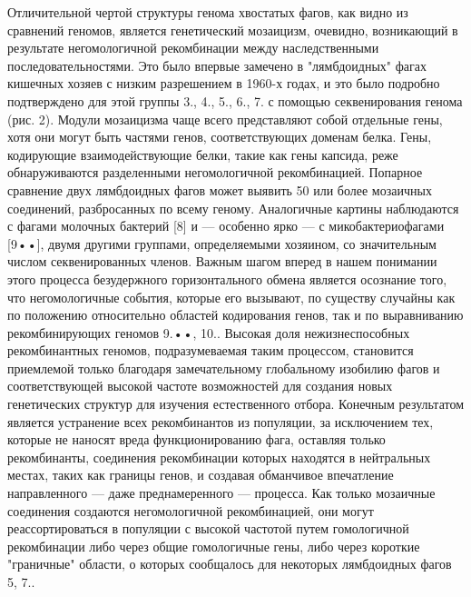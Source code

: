 \documentclass[a4paper,12pt]{article}
\begin{document}
    \par{Отличительной чертой структуры генома хвостатых фагов, как видно из сравнений геномов, является генетический
    мозаицизм, очевидно, возникающий в результате негомологичной рекомбинации между наследственными
    последовательностями. Это было впервые замечено в "лямбдоидных" фагах кишечных хозяев с низким разрешением в 1960-х
    годах, и это было подробно подтверждено для этой группы 3., 4., 5., 6., 7. с помощью секвенирования генома (рис. 2).
    Модули мозаицизма чаще всего представляют собой отдельные гены, хотя они могут быть частями генов, соответствующих
    доменам белка. Гены, кодирующие взаимодействующие белки, такие как гены капсида, реже обнаруживаются разделенными
    негомологичной рекомбинацией. Попарное сравнение двух лямбдоидных фагов может выявить 50 или более мозаичных
    соединений, разбросанных по всему геному. Аналогичные картины наблюдаются с фагами молочных бактерий [8] и —
    особенно ярко — с микобактериофагами [9••], двумя другими группами, определяемыми хозяином, со значительным числом
    секвенированных членов. Важным шагом вперед в нашем понимании этого процесса безудержного горизонтального обмена
    является осознание того, что негомологичные события, которые его вызывают, по существу случайны как по положению
    относительно областей кодирования генов, так и по выравниванию рекомбинирующих геномов 9.••, 10.. Высокая доля
    нежизнеспособных рекомбинантных геномов, подразумеваемая таким процессом, становится приемлемой только благодаря
    замечательному глобальному изобилию фагов и соответствующей высокой частоте возможностей для создания новых 
    генетических структур для изучения естественного отбора. Конечным результатом является устранение всех рекомбинантов
    из популяции, за исключением тех, которые не наносят вреда функционированию фага, оставляя только рекомбинанты,
    соединения рекомбинации которых находятся в нейтральных местах, таких как границы генов, и создавая обманчивое
    впечатление направленного — даже преднамеренного — процесса. Как только мозаичные соединения создаются
    негомологичной рекомбинацией, они могут реассортироваться в популяции с высокой частотой путем гомологичной
    рекомбинации либо через общие гомологичные гены, либо через короткие "граничные" области, о которых сообщалось для
    некоторых лямбдоидных фагов 5, 7..}
    
\end{document}
